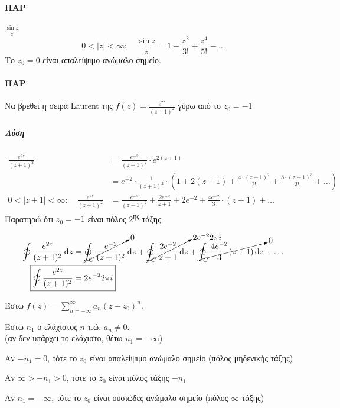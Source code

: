 \documentclass[12pt,a4paper,notitlepage,fleqn]{article}
\begin{document}

  \paragraph{ΠΑΡ} \( \frac{\sin z}{z} \)
  \[
  0<|z|<\infty:\quad \frac{\sin z}{z} = 1-\frac{z^2}{3!}+\frac{z^4}{5!}-\dots
  \]
  Το \( z_0 = 0 \) είναι απαλείψιμο ανώμαλο σημείο.

  \paragraph{ΠΑΡ}
  Να βρεθεί η σειρά Laurent της \( f(z) = \frac{e^{2z}}{(z+1)^2} \) γύρω
  από το \( z_0 = -1 \)

  \subparagraph{Λύση}
  \begin{align*}
  \frac{e^{2z}}{(z+1)^2} &= \frac{e^{-2}}{(z+1)^2} \cdot e^{2(z+1)}
  \\ &= e^{-2} \cdot \frac{1}{(z+1)^2}\cdot\left(
  1+2(z+1)+\frac{4\cdot(z+1)^2}{2!}+\frac{8\cdot(z+1)^3}{3!}+\dots
  \right) \\ 0<|z+1|<\infty :\quad \frac{e^{2z}}{(z+1)^2} &=
  \frac{e^{-2}}{(z+1)^2}+\frac{2e^{-2}}{z+1}+2e^{-2}+\frac{4e^{-2}}{3}
  \cdot (z+1)+\dots
  \end{align*}
  Παρατηρώ ότι \( z_0=-1 \) είναι πόλος 2\textsuperscript{ης} τάξης

  \begin{align*}
  \oint \frac{e^{2z}}{(z+1)^2} \dif z &=
  \cancelto{0}{\oint_C \frac{e^{-2}}{(z+1)^2}}\dif z
  +\cancelto{2e^{-2}2\pi i}{\oint_C \frac{2e^{-2}}{z+1}\dif z}
  +\cancelto{0}{\oint_C \frac{4e^{-2}}{3}(z+1)\dif z} + \dots \\
  \Aboxed{\oint \frac{e^{2z}}{(z+1)^2} &= 2e^{-2}2\pi i}
  \end{align*}

  \begin{defn*}{}
  	Έστω \( \displaystyle f(z) = \sum_{n=-\infty}^\infty a_n(z-z_0)^n \).

  	Έστω \( n_1 \) ο ελάχιστος \( n \) τ.ώ. \( a_n \neq 0 \). \\
  	(αν δεν υπάρχει το ελάχιστο, θέτω \( n_1=-\infty \))

  	\begin{enumgreek}
  		\item Αν \( -n_1 = 0 \), τότε το \( z_0 \) είναι απαλείψιμο ανώμαλο
  		σημείο (πόλος μηδενικής τάξης)
  		\item Αν \( \infty > -n_1 > 0 \), τότε το \( z_0 \) είναι πόλος τάξης
  		\( -n_1 \)
  		\item Αν \( n_1 = -\infty \), τότε το \( z_0 \) είναι ουσιώδες ανώμαλο
  		σημείο (πόλος \( \infty \) τάξης)
  	\end{enumgreek}
  \end{defn*}
\end{document}
